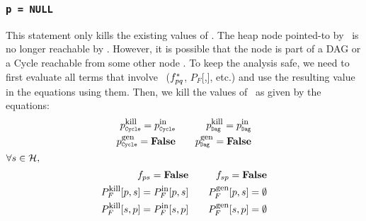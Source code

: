 \subsubsection{\tt p = NULL}
This statement only kills the existing values of
\p. The heap node pointed-to by \p\ is no longer reachable by
\p. However, it is possible that the node is part of a DAG or
a Cycle reachable from some other node \q. To keep the
analysis safe, we need to first evaluate all terms that involve
\p\ ($f_{pq}^{\ast}$, $P_F$[\q,\p], etc.) and use
the resulting value in the equations using 
them. Then, we kill the values of \p\ as given by the
equations:
\begin{eqnarray*}
  \KillC{p}  = \InC{p} &\quad& \KillD{p} = \InD{p} \\
  \GenC{p} = \false 	 &\quad& \GenD{p} = \false \\
\end{eqnarray*}
$\forall s \in \mathcal{H},$
\begin{eqnarray*}
  f_{ps} =\textbf{False}  &\quad& f_{sp} =\textbf{False} \\
  P_F^{\mbox{\footnotesize kill}}[p,s]  =  P_F^{\mbox{\footnotesize in}}[p,s] &\quad&
  P_F^{\mbox{\footnotesize gen}}[p,s]   =  \emptyset \\ 
  P_F^{\mbox{\footnotesize kill}}[s,p]  =  P_F^{\mbox{\footnotesize in}}[s,p] &\quad&
  P_F^{\mbox{\footnotesize gen}}[s,p]   =  \emptyset 
\end{eqnarray*}

